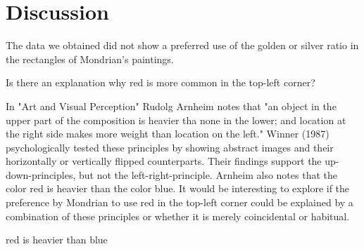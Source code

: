 \section{Discussion} \label{conclusion}




The data we obtained did not show a preferred use of the golden or silver ratio
in the rectangles of Mondrian's paintings.





Is there an explanation why red is more common in the top-left corner?

In "Art and Visual Perception" Rudolg Arnheim \cite{Arnheim1965} notes that "an
object in the upper part of the composition is heavier tha none in the lower;
and location at the right side makes more weight than location on the left."
Winner (1987) \cite{Winner1987} psychologically tested these principles by
showing abstract images and their horizontally or vertically flipped
counterparts. Their findings support the up-down-principles, but not the
left-right-principle. Arnheim also notes that the color red is heavier than the
color blue.
It would be interesting to explore if the preference by Mondrian to
use red in the top-left corner could be explained by a combination of these
principles or whether it is merely coincidental or habitual.

red is heavier than blue
